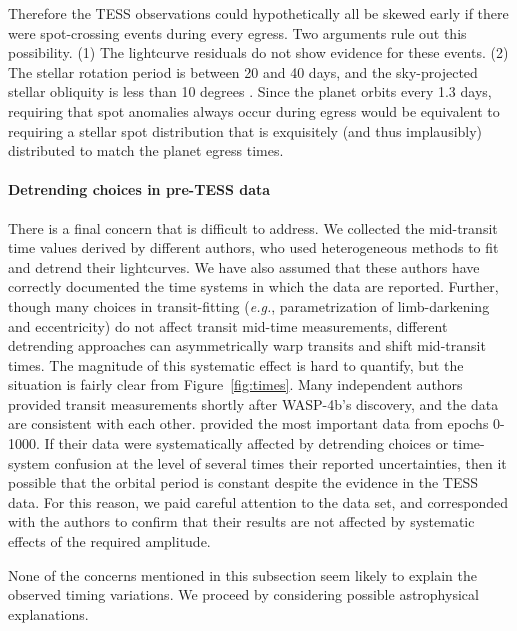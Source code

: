 \documentclass[12pt,twocolumn,tighten]{aastex62}
\begin{document}
Therefore the TESS observations could hypothetically all be skewed
early if there were spot-crossing events during every egress.  Two
arguments rule out this possibility.  (1) The lightcurve residuals do
not show evidence for these events.  (2) The stellar rotation period
is between 20 and 40 days, and the sky-projected stellar obliquity is
less than 10 degrees
\citep{triaud_spin-orbit_2010,sanchis-ojeda_starspots_2011,hoyer_tramos_2013}.
Since the planet orbits every 1.3 days, requiring that spot anomalies
always occur during egress would be equivalent to requiring a stellar
spot distribution that is exquisitely (and thus implausibly)
distributed to match the planet egress times.

\paragraph{Detrending choices in pre-TESS data}
There is a final concern that is difficult to address.  We collected
the mid-transit time values derived by different authors, who used
heterogeneous methods to fit and detrend their lightcurves.  We have
also assumed that these authors have correctly documented the time
systems in which the data are reported.  Further, though many choices
in transit-fitting ({\it e.g.}, parametrization of limb-darkening and
eccentricity) do not affect transit mid-time measurements, different
detrending approaches can asymmetrically warp transits and shift
mid-transit times.  The magnitude of this systematic effect is hard to
quantify, but the situation is fairly clear from
Figure~\ref{fig:times}.  Many independent authors provided transit
measurements shortly after WASP-4b's discovery, and the data are
consistent with each other. \citet{huitson_gemini_2017} provided the
most important data from epochs 0-1000. If their data were
systematically affected by detrending choices or time-system confusion
at the level of several times their reported uncertainties, then it
possible that the orbital period is constant despite the evidence in
the TESS data.  For this reason, we paid careful attention to the
\citet{huitson_gemini_2017} data set, and corresponded with the
authors to confirm that their results are not affected by systematic
effects of the required amplitude.

None of the concerns mentioned in this subsection seem likely to
explain the observed timing variations. We proceed by considering
possible astrophysical explanations.

\end{document}
